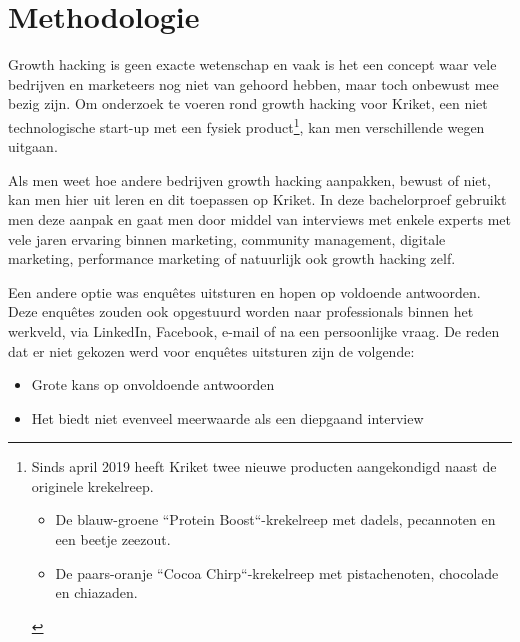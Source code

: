 
\chapter{Methodologie}
\label{ch:methodologie}


Growth hacking is geen exacte wetenschap en vaak is het een concept waar vele bedrijven en marketeers nog niet van gehoord hebben, maar toch onbewust mee bezig zijn. Om onderzoek te voeren rond growth hacking voor Kriket, een niet technologische start-up met een fysiek product\footnote{Sinds april 2019 heeft Kriket twee nieuwe producten aangekondigd naast de originele krekelreep. 
\begin{itemize}       
	\item De blauw-groene ``Protein Boost``-krekelreep met dadels, pecannoten en een beetje zeezout. 
	\item De paars-oranje ``Cocoa Chirp``-krekelreep met pistachenoten, chocolade en chiazaden.
\end{itemize}
}, kan men verschillende wegen uitgaan. 

Als men weet hoe andere bedrijven growth hacking aanpakken, bewust of niet, kan men hier uit leren en dit toepassen op Kriket. In deze bachelorproef gebruikt men deze aanpak en gaat men door middel van interviews met enkele experts met vele jaren ervaring binnen marketing, community management, digitale marketing, performance marketing of natuurlijk ook growth hacking zelf. 

Een andere optie was enquêtes uitsturen en hopen op voldoende antwoorden. Deze enquêtes zouden ook opgestuurd worden naar professionals binnen het werkveld, via LinkedIn, Facebook, e-mail of na een persoonlijke vraag. De reden dat er niet gekozen werd voor enquêtes uitsturen zijn de volgende:
\begin{itemize} 
	\item Grote kans op onvoldoende antwoorden
	\item Het biedt niet evenveel meerwaarde als een diepgaand interview
\end{itemize}

